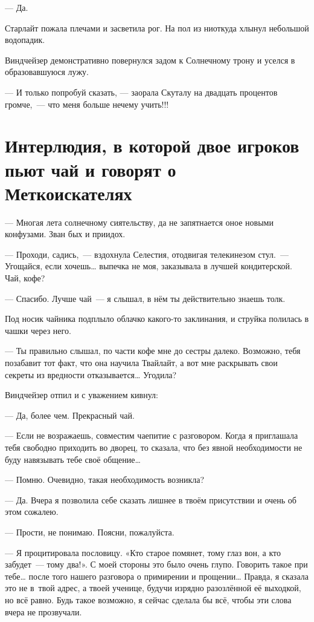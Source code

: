 \documentclass[fontsize=11pt,a5paper,titlepage=firstcover]{scrbook}
\begin{document}
--- Да.

Старлайт пожала плечами и засветила рог. На пол из ниоткуда хлынул небольшой водопадик.

Виндчейзер демонстративно повернулся задом к Солнечному трону и уселся в образовавшуюся лужу.

--- И только попробуй сказать, --- заорала Скуталу на двадцать процентов громче,~--- что меня больше нечему учить!!!


\chapter*{Интерлюдия, в которой двое игроков пьют чай и говорят о Меткоискателях}

--- Многая лета солнечному сиятельству, да не запятнается оное новыми конфузами. Зван бых и приидох.

--- Проходи, садись,~--- вздохнула Селестия, отодвигая телекинезом стул.~--- Угощайся, если хочешь{\ldots} выпечка не моя, заказывала в лучшей кондитерской. Чай, кофе?

--- Спасибо. Лучше чай~--- я слышал, в нём ты действительно знаешь толк.

Под носик чайника подплыло облачко какого-то заклинания, и струйка полилась в чашки через него.

--- Ты правильно слышал, по части кофе мне до сестры далеко. Возможно, тебя позабавит тот факт, что она научила Твайлайт, а вот мне раскрывать свои секреты из вредности отказывается{\ldots} Угодила?

Виндчейзер отпил и с уважением кивнул:

--- Да, более чем. Прекрасный чай.

--- Если не возражаешь, совместим чаепитие с разговором. Когда я приглашала тебя свободно приходить во дворец, то сказала, что без явной необходимости не буду навязывать тебе своё общение{\ldots}

--- Помню. Очевидно, такая необходимость возникла?

--- Да. Вчера я позволила себе сказать лишнее в твоём присутствии и очень об этом сожалею.

--- Прости, не понимаю. Поясни, пожалуйста.

--- Я процитировала пословицу. «Кто старое помянет, тому глаз вон, а кто забудет~--- тому два!». С моей стороны это было очень глупо. Говорить такое при тебе{\ldots} после того нашего разговора о примирении и прощении{\ldots} Правда, я сказала это не в~твой адрес, а твоей ученице, будучи изрядно разозлённой её выходкой, но всё равно. Будь такое возможно, я сейчас сделала бы всё, чтобы эти слова вчера не прозвучали.
\end{document}
